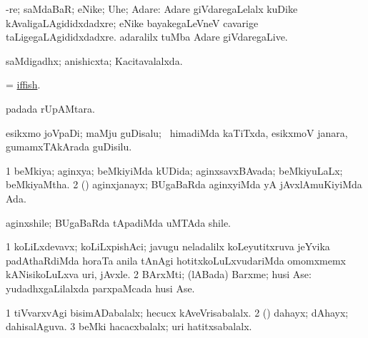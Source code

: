 \bentry
{}
\gl{\nA}
\bmng
-re; saMdaBaR; eNike; Uhe; Adare:  Adare giVdaregaLelalx kuDike kAvaligaLAgididxdadxre; eNike bayakegaLeVneV cavarige taLigegaLAgididxdadxre.  adaralilx tuMba Adare giVdaregaLive. 
\emng
\eentry

\bentry
{}
\gl{\saMkiSx}
\bmng
{} 
\emng
\eentry

\bentry
{}
\gl{\saMkiSx}
\bmng
{} 
\emng
\eentry

\bentry
{}
\gl{\gu}
\bmng
saMdigadhx; anishicxta; Kacitavalalxda. 
\emng
\eentry

\bentry
{}
\gl{\gu}
\bmng
 = \hyperlink{iffish}{iffish}. 
\emng
\eentry

\bentry
{}
\gl{\nA}
\bmng
{} padada rUpAMtara. 
\emng
\eentry

\bentry
{}
\gl{\nA}
\bmng
esikxmo joVpaDi; maMju guDisalu; \kanmu\ himadiMda kaTiTxda, esikxmoV janara, gumamxTAkArada guDisilu.   
\emng
\eentry

\bentry
{}
\gl{\gu}
\bmng
\bnum
\num{1} beMkiya; aginxya; beMkiyiMda kUDida; aginxsavxBAvada; beMkiyuLaLx; beMkiyaMtha. 
\num{2} (\BUvi) aginxjanayx; BUgaBaRda aginxyiMda yA jAvxlAmuKiyiMda Ada. 
\enum
\emng
\eentry

\bentry
{}
\gl{\nA}
\bmng
aginxshile; BUgaBaRda tApadiMda uMTAda shile. 
\emng
\eentry

\bentry
{}
\gl{\nA}
\bmng
{} 
\bnum
\num{1} koLiLxdevavx; koLiLxpishAci; javugu neladalilx koLeyutitxruva jeYvika padAthaRdiMda horaTa anila tAnAgi hotitxkoLuLxvudariMda omomxmemx kANisikoLuLxva uri, jAvxle. 
\num{2} BArxMti; (lABada) Barxme; husi Ase:  yudadhxgaLilalxda parxpaMcada husi Ase. 
\enum
\emng
\eentry

\bentry
{}
\gl{\gu}
\bmng
\bnum
\num{1} tiVvarxvAgi bisimADabalalx; hecucx kAveVrisabalalx. 
\num{2} (\ravi) dahayx; dAhayx; dahisalAguva. 
\num{3} beMki hacacxbalalx; uri hatitxsabalalx. 
\enum
\emng
\eentry

